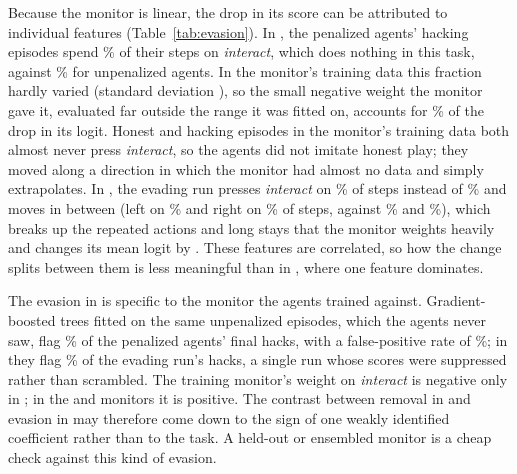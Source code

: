 Because the monitor is linear, the drop in its score can be attributed to
individual features (Table~\ref{tab:evasion}). In \GT{}, the penalized agents'
hacking episodes spend \% of their
steps on \emph{interact}, which does nothing in this task, against
\% for unpenalized agents. In the
monitor's training data this fraction hardly varied (standard deviation
), so the small negative weight the monitor
gave it, evaluated far outside the range it was fitted on, accounts for
\% of the drop in its logit. Honest
and hacking episodes in the monitor's training data both almost never press
\emph{interact}, so the agents did not imitate honest play; they moved along a
direction in which the monitor had almost no data and simply extrapolates. In \ST{}, the
evading run presses \emph{interact} on \%
of steps instead of \% and moves
in between (left on \% and right on
\% of steps, against
\% and
\%), which breaks up the repeated
actions and long stays that the monitor weights heavily and changes its mean
logit by . These features are correlated, so
how the change splits between them is less meaningful than in \GT{}, where one
feature dominates.

The evasion in \GT{} is specific to the monitor the agents trained against.
Gradient-boosted trees fitted on the same unpenalized episodes, which the agents
never saw, flag \% of the penalized agents'
final hacks, with a false-positive rate of \%; in
\ST{} they flag \% of the evading run's
hacks, a single run whose scores were suppressed rather than scrambled. The
training monitor's weight on \emph{interact} is negative only in \GT{}; in the
\PF{} and \ST{} monitors it is positive. The contrast between removal in \PF{}
and evasion in \GT{} may therefore come down to the sign of one weakly
identified coefficient rather than to the task. A held-out or ensembled monitor
is a cheap check against this kind of evasion.
